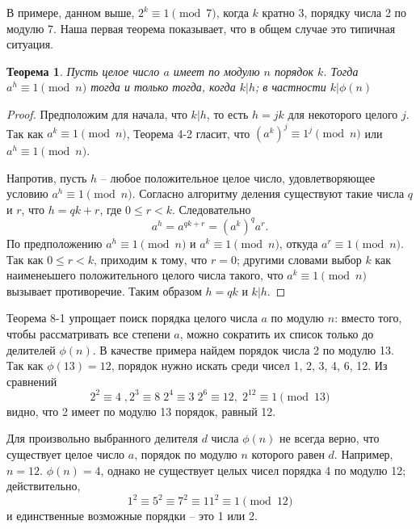 \documentclass[11pt]{article}
\newtheorem{theorem}{Теорема}
\begin{document}
В примере, данном выше, $2^k\equiv1\pmod{7}$, когда $k$ кратно 3, порядку числа 2 по модулю 7. Наша первая теорема показывает, что в общем случае это типичная ситуация.
\begin{theorem}
	\it Пусть целое число $a$ имеет по модулю $n$ порядок $k$. Тогда $a^h\equiv1\pmod{n}$ тогда и только тогда, когда $k|h$; в частности $k|\phi(n)$
\end{theorem}
\newpage
\thispagestyle{fancyOdd}
\begin{proof}
	Предположим для начала, что $k|h$, то есть $h=jk$ для некоторого целого $j$. Так как $a^k\equiv1\pmod{n}$, Теорема 4-2 гласит, что $(a^k)^j\equiv1^j\pmod{n}$ или $a^h\equiv1\pmod{n}$.
	
	Напротив, пусть $h$ -- любое положительное целое число, удовлетворяющее условию $a^h\equiv1\pmod{n}$. Согласно алгоритму деления существуют такие числа $q$ и $r$, что $h=qk+r$, где $0\leq{r}<k$. Следовательно $$a^h=a^{qk+r}=(a^k)^qa^r.$$	
	По предположению $a^h\equiv1\pmod{n}$ и $a^k\equiv1\pmod{n}$, откуда $a^r\equiv1\pmod{n}$. Так как $0\leq{r}<k$, приходим к тому, что $r=0$; другими словами выбор $k$ как наименеьшего положительного целого числа такого, что $a^k\equiv1\pmod{n}$ вызывает противоречие. Таким образом $h=qk$ и $k|h$.
\end{proof}

Теорема 8-1 упрощает поиск порядка целого числа $a$ по модулю $n$: вместо того, чтобы рассматривать все степени $a$, можно сократить их список только до  делителей $\phi(n)$. В качестве примера найдем порядок числа 2 по модулю 13. Так как $\phi(13)=12$, порядок нужно искать среди чисел 1, 2, 3, 4, 6, 12. Из сравнений $$2^2\equiv4\;,2^3\equiv8\;2^4\equiv3\;2^6\equiv12,\;2^{12}\equiv1\pmod{13}$$ видно, что 2 имеет по модулю 13 порядок, равный 12.

Для произвольно выбранного делителя $d$ числа $\phi(n)$ не всегда верно, что существует целое число $a$, порядок по модулю $n$ которого равен $d$. Например, $n=12$. $\phi(n)=4$, однако не существует целых чисел порядка 4 по модулю 12; действительно, $$1^2\equiv5^2\equiv7^2\equiv11^2\equiv1\pmod{12}$$ и единственные возможные порядки -- это 1 или 2.
\end{document}
